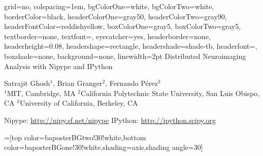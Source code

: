 \documentclass[portrait,final]{baposter}
\begin{document}
\newlength{\leftimgwidth}
\begin{poster}%
  {
  grid=no,
  colspacing=1em,
  bgColorOne=white,
  bgColorTwo=white,
  borderColor=black,
  headerColorOne=gray50,
  headerColorTwo=gray90,
  headerFontColor=reddishyellow,
  boxColorOne=gray5,
  boxColorTwo=gray5,
  textborder=none, %
  textfont=\sf, %
  eyecatcher=yes,
  headerborder=none,
  headerheight=0.08\textheight,
  headershape=rectangle,
  headershade=shade-tb,
  headerfont=\Large\textsf, %
  boxshade=none, %
  background=none,
  linewidth=2pt
  }
{}
  {\sf %
  Distributed Neuroimaging Analysis with Nipype and IPython\vspace{0.15em}}
  {\sf %
  Satrajit Ghosh$^1$, Brian Granger$^2$, Fernando P\'{e}rez$^3$\\\vspace{0.3em}
  \small\sf$^1$MIT, Cambridge, MA $^2$California Polytechnic State
  University, San Luis Obispo, CA $^3$University of California,
  Berkeley, CA\\\vspace{0.3em}

  \large{Nipype: \url{http://nipy.sf.net/nipype} IPython: \url{http://ipython.scipy.org} }

  }



  =[top color=baposterBGtwo!30!white,bottom color=baposterBGone!30!white,shading=axis,shading angle=30]

     \setlength{\leftimgwidth}{0.78em+8.0em}



\end{poster}
\end{document}
